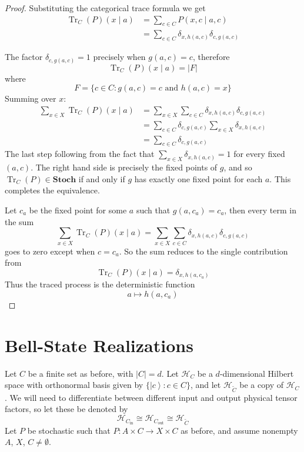 \documentclass[10pt, a4paper]{article}
\newcommand{\ket}[1]{\left|{#1}\right\rangle}
\newcommand{\Tr}[0]{\operatorname{Tr}}
\newcommand{\HC}[0]{\mathcal{H}_C}
\newcommand{\HCC}[0]{\mathcal{H}_{\widetilde{C}}}
\newcommand{\HCin}[0]{\mathcal{H}_{C_{\mathrm{in}}}}
\newcommand{\HCout}[0]{\mathcal{H}_{C_{\mathrm{out}}}}
\begin{document}
\begin{proof}
    Substituting the categorical trace formula we get 
    \begin{align*}
        \Tr_C(P)(x \mid a) &= \sum_{c \in C} P(x, c \mid a, c) \\
        &= \sum_{c \in C} \delta_{x, h(a, c)} \delta_{c, g(a, c)}
    \end{align*}

    The factor $\delta_{c, g(a, c)} = 1$ precisely when $g(a,c) = c$, therefore $$ \Tr_C(P)(x \mid a) = |F| $$ where $$ F = \{ c \in C : g(a,c)=c \text{ and } h(a,c) = x \}$$ Summing over $x$:
    \begin{align*}
        \sum_{x \in X} \Tr_C(P)(x\mid a) &= \sum_{x \in X} \sum_{c \in C} \delta_{x, h(a, c)} \delta_{c, g(a, c)} \\
        &= \sum_{c \in C} \delta_{c, g(a,c)} \sum_{x\in X} \delta_{x, h(a, c)} \\
        &= \sum_{c \in C} \delta_{c, g(a,c)}
    \end{align*}
    The last step following from the fact that $\sum_{x\in X} \delta_{x, h(a, c)} = 1$ for every fixed $(a,c)$. The right hand side is precisely the fixed points of $g$, and so $\Tr_C(P) \in \mathbf{Stoch}$ if and only if $g$ has exactly one fixed point for each $a$. This completes the equivalence.
    
    Let $c_a$ be the fixed point for some $a$ such that $g(a,c_a) = c_a$, then every term in the sum $$ \sum_{x \in X} \Tr_C(P)(x\mid a) = \sum_{x \in X} \sum_{c \in C} \delta_{x, h(a, c)} \delta_{c, g(a, c)} $$ goes to zero except when $c = c_a$. So the sum reduces to the single contribution from $$ \Tr_C(P)(x \mid a) = \delta_{x, h(a, c_a)} $$ Thus the traced process is the deterministic function $$ a \mapsto h(a, c_a)$$
\end{proof}

\section{Bell-State Realizations}\label{sec:Bell}

Let $C$ be a finite set as before, with $|C|=d$. Let $\HC$ be a $d$-dimensional Hilbert space with orthonormal basis given by $\{ \ket{c} : c \in C \}$, and let $\HCC$ be a copy of $\HC$. We will need to differentiate between different input and output physical tensor factors, so let these be denoted by $$ \HCin \cong \HCout \cong \HCC $$ Let $P$ be stochastic such that $P : A \times C \to X \times C$ as before, and assume nonempty $A$, $X$, $C \neq \emptyset$. 
\end{document}
